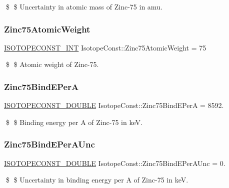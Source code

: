 \$ \$ Uncertainty in atomic mass of Zinc-\/75 in amu. \mbox{\label{group___isotope_const-_zinc-_zn75_ga81110788e0255448a490722f9f8f960e}} 
\subsubsection{\texorpdfstring{Zinc75\+Atomic\+Weight}{Zinc75AtomicWeight}}
{\footnotesize\ttfamily \mbox{\hyperlink{group___isotope_const-_macros_ga5f18360b3e99483a35c32d789e62621c}{I\+S\+O\+T\+O\+P\+E\+C\+O\+N\+S\+T\+\_\+\+I\+NT}} Isotope\+Const\+::\+Zinc75\+Atomic\+Weight = 75}

\$ \$ Atomic weight of Zinc-\/75. \mbox{\label{group___isotope_const-_zinc-_zn75_ga10d757ab5b0612f345623bad2d0161b0}} 
\subsubsection{\texorpdfstring{Zinc75\+Bind\+E\+PerA}{Zinc75BindEPerA}}
{\footnotesize\ttfamily \mbox{\hyperlink{group___isotope_const-_macros_ga8f45a7272ce02c0b4c65c44636ed719a}{I\+S\+O\+T\+O\+P\+E\+C\+O\+N\+S\+T\+\_\+\+D\+O\+U\+B\+LE}} Isotope\+Const\+::\+Zinc75\+Bind\+E\+PerA = 8592.}

\$ \$ Binding energy per A of Zinc-\/75 in keV. \mbox{\label{group___isotope_const-_zinc-_zn75_ga5b0b7ba931575d7a9e82a5b63d66b62f}} 
\subsubsection{\texorpdfstring{Zinc75\+Bind\+E\+Per\+A\+Unc}{Zinc75BindEPerAUnc}}
{\footnotesize\ttfamily \mbox{\hyperlink{group___isotope_const-_macros_ga8f45a7272ce02c0b4c65c44636ed719a}{I\+S\+O\+T\+O\+P\+E\+C\+O\+N\+S\+T\+\_\+\+D\+O\+U\+B\+LE}} Isotope\+Const\+::\+Zinc75\+Bind\+E\+Per\+A\+Unc = 0.}

\$ \$ Uncertainty in binding energy per A of Zinc-\/75 in keV. \mbox{\label{group___isotope_const-_zinc-_zn75_ga7a6ef78639c9dc987a0a4fc28104b299}} 
